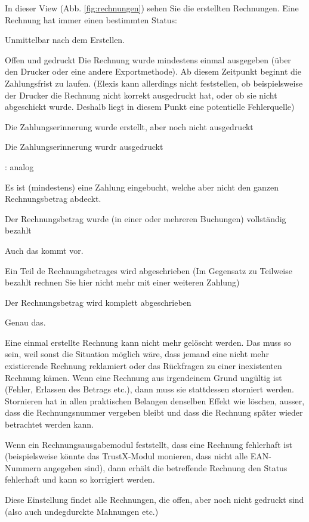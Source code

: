 In dieser View (Abb. \ref{fig:rechnungen}) sehen Sie die erstellten Rechnungen. Eine Rechnung hat immer einen bestimmten Status:
\begin{description}
    \item [Offen] Unmittelbar nach dem Erstellen.
    \item{Offen und gedruckt} Die Rechnung wurde mindestens einmal ausgegeben (über den Drucker oder eine andere Exportmethode). Ab diesem Zeitpunkt beginnt die Zahlungsfrist zu laufen. (Elexis kann allerdings nicht feststellen, ob beispielsweise der Drucker die Rechnung nicht korrekt ausgedruckt hat, oder ob sie nicht abgeschickt wurde. Deshalb liegt in diesem Punkt eine potentielle Fehlerquelle)
    \item[Zahlungserinnerung] Die Zahlungserinnerung wurde erstellt, aber noch nicht ausgedruckt
    \item[ZE gedruckt] Die Zahlungserinnerung wurdr ausgedruckt
    \item [2. Mahnung erstellt, 2. Mahnung gedruckt, 3. Mahnung erstellt, 3. Mahnung gedruckt]: analog
    \item[Teilweise bezahlt] Es ist (mindestens) eine Zahlung eingebucht, welche aber nicht den ganzen Rechnungsbetrag abdeckt.
    \item[bezahlt] Der Rechnungsbetrag wurde (in einer oder mehreren Buchungen) vollständig bezahlt
    \item [zuviel bezahlt] Auch das kommt vor.
    \item [Teilverlust] Ein Teil de Rechnungsbetrages wird abgeschrieben (Im Gegensatz zu \glqq Teilweise bezahlt\grqq{} rechnen Sie hier nicht mehr mit einer weiteren Zahlung)
    \item [Totalverlust] Der Rechnungsbetrag wird komplett abgeschrieben
    \item [In Betreibung] Genau das.
    \item [Storniert] Eine einmal erstellte Rechnung kann nicht mehr gelöscht werden. Das muss so sein, weil sonst die Situation möglich wäre, dass jemand eine nicht mehr existierende Rechnung reklamiert oder das Rückfragen zu einer inexistenten Rechnung kämen. Wenn eine Rechnung aus irgendeinem Grund ungültig ist (Fehler, Erlassen des Betrags etc.), dann muss sie stattdessen storniert werden. Stornieren hat in allen praktischen Belangen denselben Effekt wie löschen, ausser, dass die Rechnungsnummer vergeben bleibt und dass die Rechnung später wieder betrachtet werden kann.
    \item [fehlerhaft] Wenn ein Rechnungsausgabemodul feststellt, dass eine Rechnung fehlerhaft ist (beispielsweise könnte das TrustX-Modul monieren, dass nicht alle EAN-Nummern angegeben sind), dann erhält die betreffende Rechnung den Status fehlerhaft und kann so korrigiert werden.
    \item [zu drucken] Diese Einstellung findet alle Rechnungen, die offen, aber noch nicht gedruckt sind (also auch undegdurckte Mahnungen etc.)
\end{description}
